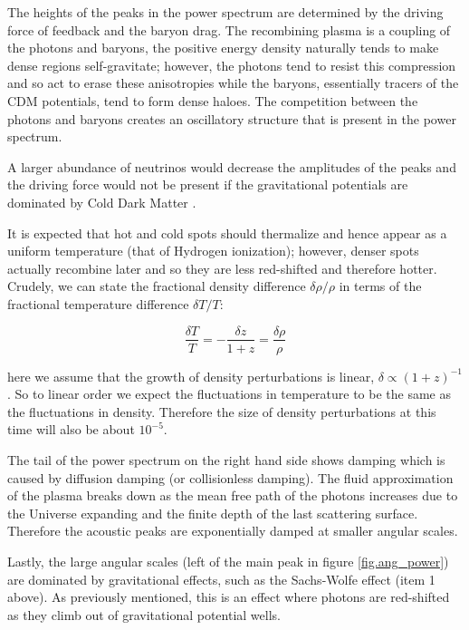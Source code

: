 The heights of the peaks in the power spectrum are determined by the driving force of feedback and the baryon drag.
The recombining plasma is a coupling of the photons and baryons, the positive energy density naturally tends to make dense regions self-gravitate; however, the photons tend to resist this compression and so act to erase these anisotropies while the baryons, essentially tracers of the CDM potentials, tend to form dense haloes. The competition between the photons and baryons creates an oscillatory structure that is present in the power spectrum.

A larger abundance of neutrinos would decrease the amplitudes of the peaks and the driving force would not be present if the gravitational potentials are dominated by Cold Dark Matter \citep{bib_huw2}.

It is expected that hot and cold spots should thermalize and hence appear as a uniform temperature (that of Hydrogen ionization); however, denser spots actually recombine later and so they are less red-shifted and therefore hotter. Crudely, we can state the fractional density difference $\delta \rho / \rho$ in terms of the fractional temperature difference $\delta T / T$:

\begin{equation}
\frac{\delta T}{T} = - \frac{\delta z}{1+ z} = \frac{\delta \rho}{\rho}
\end{equation}

\noindent here we assume that the growth of density perturbations is linear, $\delta \propto (1 +z)^{-1}$. So to linear order we expect the fluctuations in temperature to be the same as the fluctuations in density. Therefore the size of density perturbations at this time will also be about $10^{-5}$.

The tail of the power spectrum on the right hand side shows damping which is caused by diffusion damping (or collisionless damping). The fluid approximation of the plasma breaks down as the mean free path of the photons increases due to the Universe expanding and the finite depth of the last scattering surface. Therefore the acoustic peaks are exponentially damped at smaller angular scales.

Lastly, the large angular scales (left of the main peak in figure \ref{fig.ang_power}) are dominated by gravitational effects, such as the Sachs-Wolfe effect (item 1 above). As previously mentioned, this is an effect where photons are red-shifted as they climb out of gravitational potential wells.



